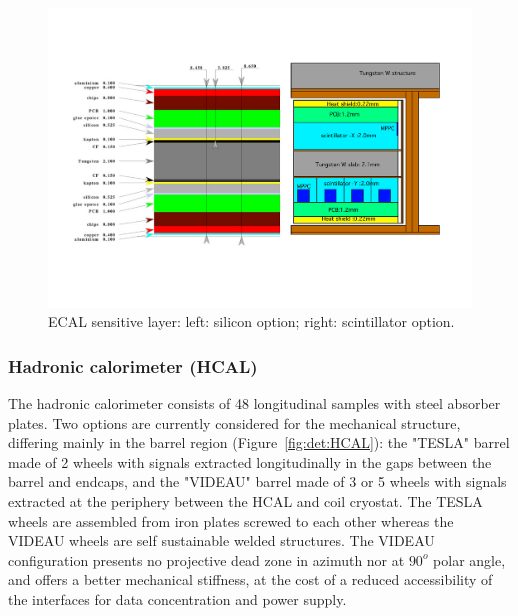 \begin{figure}[t!]
\centering
\includegraphics[width=0.8\hsize]{Detector/fig/ECAL_readout.pdf}
\caption{ECAL sensitive layer: left: silicon option; right: scintillator option.}
\label{fig:det:ECAL_readout}
\end{figure}


\subsubsection*{Hadronic calorimeter (HCAL)}
\label{ild:sec:hcal}

The hadronic calorimeter consists of 48 longitudinal samples with steel absorber plates. Two options are currently considered for the mechanical structure, differing mainly in the barrel region (Figure~\ref{fig:det:HCAL}): the "TESLA" barrel made of 2 wheels with signals extracted longitudinally in the gaps between the barrel and endcaps, and the "VIDEAU" barrel made of 3 or 5 wheels with signals extracted at the periphery between the HCAL and coil cryostat. The TESLA wheels are assembled from iron plates screwed to each other whereas the VIDEAU wheels are self sustainable welded structures. The VIDEAU configuration presents no projective dead zone in azimuth nor at $90^o$ polar angle, and offers a better mechanical stiffness, at the cost of a reduced accessibility of the interfaces for data concentration and power supply.

